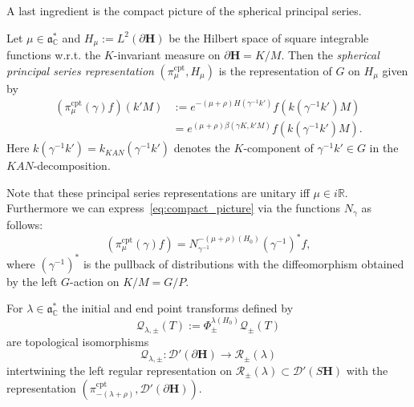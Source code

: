 \documentclass[AHL, Unicode, longabstracts, published]{cedram}
\DeclareMathOperator{\cpt}{cpt}
\newcommand{\mc}{\mathcal}
\newcommand{\cc}{\mathbb{C}}
\newcommand{\bfh}{\mathbf{H}}
\newcommand{\pl}{\partial}
\newcommand{\R}{\mathbb R}
\renewcommand{\a}{\mathfrak a}
\begin{document}
A last ingredient is the compact picture of the spherical principal series.

\begin{defi}\label{prop:compact_pic}
Let $\mu\in\a^*_\cc$ and $H_\mu:= L^2(\pl{\bfh})$ be the Hilbert space of square integrable functions w.r.t. the $K$-invariant measure on $\pl{\bfh}=K/M$. Then the \emph{spherical principal series representation} $(\pi^{\cpt}_\mu, H_\mu)$ is the representation of $G$ on $H_\mu$ given by
\begin{align}\label{eq:compact_picture}
\left(\pi^{\cpt}_\mu(\gamma) f\right) (k'M) &:= e^{-(\mu+\rho)H(\gamma^{-1}k')}f\left(k\left(\gamma^{-1}k'\right)M\right)\\
&=\nonumber e^{(\mu+\rho)\beta(\gamma K,k'M)}f\left(k\left(\gamma^{-1}k'\right)M\right).
\end{align}
Here $k(\gamma^{-1}k')=k_{KAN}(\gamma^{-1}k')$ denotes the $K$-component of $\gamma^{-1}k'\in G$ in the $KAN$-decomposition.
\end{defi}

Note that these principal series representations are unitary iff $\mu\in i\R$. Furthermore we can express~\eqref{eq:compact_picture} via the functions $N_\gamma$ as follows:
\begin{equation}\label{eq:compact_picture_N_gamma}
\left(\pi^{\cpt}_\mu(\gamma) f\right)= N_{\gamma^{-1}}^{-(\mu+\rho)(H_0)}\left(\gamma^{-1}\right)^* f,
\end{equation}
where $(\gamma^{-1})^*$ is the pullback of distributions with the diffeomorphism obtained by the left $G$-action on $K/M=G/P$.

\begin{prop}\label{prop:classical_compact_intertwining}
For $\lambda \in \a^*_\cc$ the initial and end point transforms defined by
\begin{equation}\label{eq:Q_lambda_def}
\mathcal Q_{\lambda,\pm}(T) := \Phi_\pm^{\lambda(H_0)}\mathcal Q_\pm(T)
\end{equation}
are topological isomorphisms
\[
\mathcal Q_{\lambda,\pm}: \mathcal D'(\pl{\bfh})\to \mc{R}_\pm(\lambda)
\]
intertwining the left regular representation on $\mc{R}_\pm(\lambda) \subset \mc{D}'(S{\bfh})$ with the representation $(\pi^{\cpt}_{-(\lambda+\rho)},\mathcal D'(\pl{\bfh}))$.
\end{prop}
\end{document}
